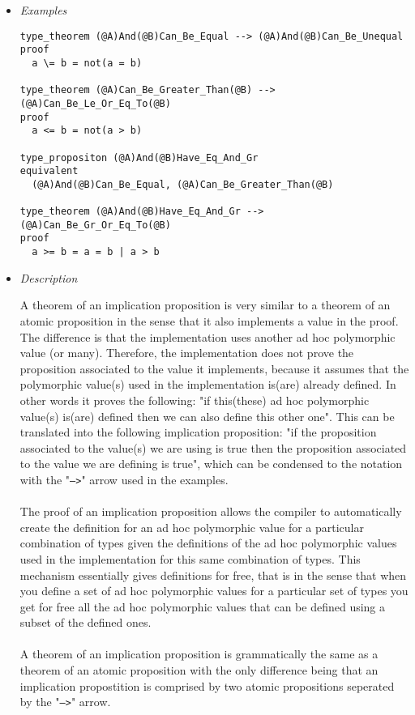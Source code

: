 \documentclass{article}
\begin{document}
\begin{itemize}
\item \textit{Examples}

\begin{verbatim}
type_theorem (@A)And(@B)Can_Be_Equal --> (@A)And(@B)Can_Be_Unequal
proof
  a \= b = not(a = b)

type_theorem (@A)Can_Be_Greater_Than(@B) --> (@A)Can_Be_Le_Or_Eq_To(@B)
proof
  a <= b = not(a > b)

type_propositon (@A)And(@B)Have_Eq_And_Gr
equivalent
  (@A)And(@B)Can_Be_Equal, (@A)Can_Be_Greater_Than(@B)

type_theorem (@A)And(@B)Have_Eq_And_Gr --> (@A)Can_Be_Gr_Or_Eq_To(@B)
proof
  a >= b = a = b | a > b
\end{verbatim}

\item \textit{Description}

A theorem of an implication proposition is very similar to a theorem of an
atomic proposition in the sense that it also implements a value in the proof.
The difference is that the implementation uses another ad hoc polymorphic value
(or many). Therefore, the implementation does not prove the proposition
associated to the value it implements, because it assumes that the polymorphic
value(s) used in the implementation is(are) already defined. In other words it
proves the following: "if this(these) ad hoc polymorphic value(s) is(are)
defined then we can also define this other one". This can be translated into
the following implication proposition: "if the proposition associated to the
value(s) we are using is true then the proposition associated to the value we
are defining is true", which can be condensed to the notation with the
"\texttt{-->}" arrow used in the examples.
\\\\
The proof of an implication proposition allows the compiler to
automatically create the definition for an ad hoc polymorphic value for a
particular combination of types given the definitions of the ad hoc polymorphic
values used in the implementation for this same combination of types. This
mechanism essentially gives definitions for free, that is in the sense that
when you define a set of ad hoc polymorphic values for a particular set of
types you get for free all the ad hoc polymorphic values that can be defined
using a subset of the defined ones. 
\\\\
A theorem of an implication proposition is grammatically the same as
a theorem of an atomic proposition with the only difference being that an 
implication propostition is comprised by two atomic propositions seperated by
the "\texttt{-->}" arrow.

\end{itemize}
\end{document}
